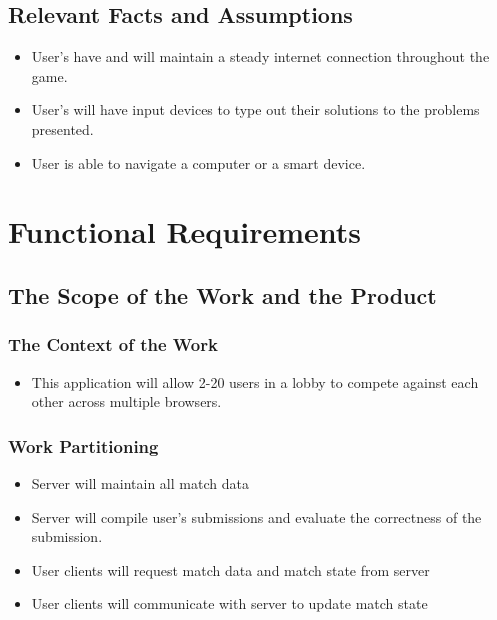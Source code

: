 \documentclass[12pt, titlepage]{article}
\begin{document}
\subsection{Relevant Facts and Assumptions}
\begin{itemize}
    \item User's have and will maintain a steady internet connection throughout the game.
    \item User's will have input devices to type out their solutions to the problems presented. 
    \item User is able to navigate a computer or a smart device.
\end{itemize}

\section{Functional Requirements}

\subsection{The Scope of the Work and the Product}

\subsubsection{The Context of the Work}
\begin{itemize} 
    \item This application will allow 2-20 users in a lobby to compete against each other across multiple browsers.
\end{itemize}

\subsubsection{Work Partitioning}
\begin{itemize} 
    \item Server will maintain all match data
    \item Server will compile user's submissions and evaluate the correctness of the submission. 
    \item User clients will request match data and match state from server
    \item User clients will communicate with server to update match state
\end{itemize}
\end{document}
